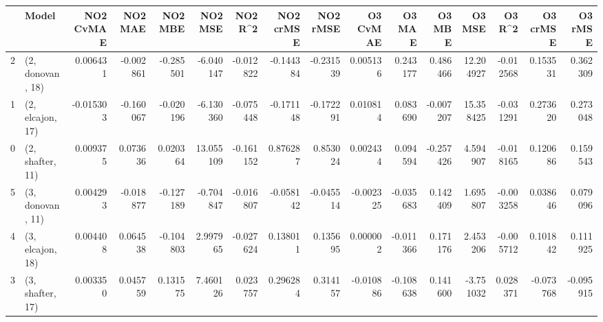 \begin{tabular}{llrrrrrrrrrrrrrr}
\toprule
{} &             Model &  NO2 CvMAE &   NO2 MAE &   NO2 MBE &    NO2 MSE &   NO2 R\textasciicircum2 &  NO2 crMSE &  NO2 rMSE &  O3 CvMAE &    O3 MAE &    O3 MBE &     O3 MSE &    O3 R\textasciicircum2 &  O3 crMSE &   O3 rMSE \\
\midrule
2 &  (2, donovan, 18) &   0.006431 & -0.002861 & -0.285501 &  -6.040147 & -0.012822 &  -0.144384 & -0.231539 &  0.005136 &  0.243177 &  0.486466 &  12.204927 & -0.012568 &  0.153531 &  0.362309 \\
1 &  (2, elcajon, 17) &  -0.015303 & -0.160067 & -0.020196 &  -6.130360 & -0.075448 &  -0.171148 & -0.172291 &  0.010814 &  0.083690 & -0.007207 &  15.358425 & -0.031291 &  0.273620 &  0.273048 \\
0 &  (2, shafter, 11) &   0.009375 &  0.073636 &  0.020364 &  13.055109 & -0.161152 &   0.876287 &  0.853024 &  0.002434 &  0.094594 & -0.257426 &   4.594907 & -0.018165 &  0.120686 &  0.159543 \\
5 &  (3, donovan, 11) &   0.004293 & -0.018877 & -0.127189 &  -0.704847 & -0.016807 &  -0.058142 & -0.045514 & -0.002325 & -0.035683 &  0.142409 &   1.695807 & -0.003258 &  0.038646 &  0.079096 \\
4 &  (3, elcajon, 18) &   0.004408 &  0.064538 & -0.104803 &   2.997965 & -0.027624 &   0.138011 &  0.135695 &  0.000002 & -0.011366 &  0.171176 &   2.453206 & -0.005712 &  0.101842 &  0.111925 \\
3 &  (3, shafter, 17) &   0.003350 &  0.045759 &  0.131575 &   7.460126 &  0.023757 &   0.296284 &  0.314157 & -0.010886 & -0.108638 &  0.141600 &  -3.751032 &  0.028371 & -0.073768 & -0.095915 \\
\bottomrule
\end{tabular}

